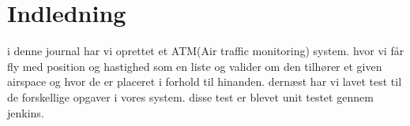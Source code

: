 \section{Indledning}
i denne journal har vi oprettet et ATM(Air traffic monitoring) system. hvor vi får fly med position og hastighed som en liste og valider om den tilhører et given airspace og hvor de er placeret i forhold til hinanden. dernæst har vi lavet test til de forskellige opgaver i vores system. disse test er blevet unit testet gennem jenkins.